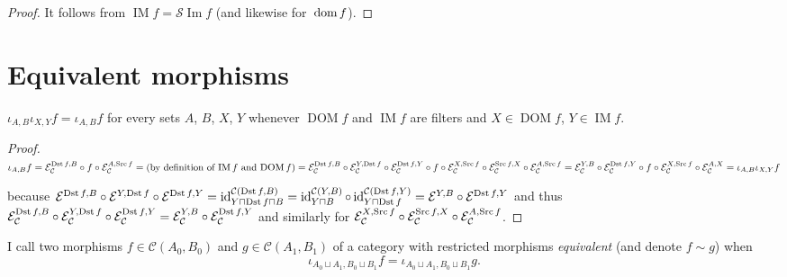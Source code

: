 \begin{proof}
It follows from $\operatorname{IM}f=\mathscr{S}\operatorname{Im}f$
(and likewise for~$\operatorname{dom} f$).
\end{proof}

\section{Equivalent morphisms}

\begin{prop}\label{two-iotas}
  $\iota_{A, B} \iota_{X, Y} f = \iota_{A, B} f$ for every sets $A$, $B$, $X$,
  $Y$ whenever $\operatorname{DOM} f$ and $\operatorname{IM} f$ are filters and $X \in
  \operatorname{DOM} f$, $Y \in \operatorname{IM} f$.
\end{prop}

\begin{proof}
  $\iota_{A, B} f =\mathcal{E}_{\mathcal{C}}^{\operatorname{Dst} f, B} \circ f \circ
  \mathcal{E}_{\mathcal{C}}^{A, \operatorname{Src} f} = \text{(by definition of
  $\operatorname{IM} f$ and $\operatorname{DOM} f$)} =\mathcal{E}_{\mathcal{C}}^{\operatorname{Dst} f,
  B} \circ \mathcal{E}_{\mathcal{C}}^{Y, \operatorname{Dst} f} \circ
  \mathcal{E}_{\mathcal{C}}^{\operatorname{Dst} f, Y} \circ f \circ
  \mathcal{E}_{\mathcal{C}}^{X, \operatorname{Src} f} \circ
  \mathcal{E}_{\mathcal{C}}^{\operatorname{Src} f, X} \circ
  \mathcal{E}_{\mathcal{C}}^{A, \operatorname{Src} f} =\mathcal{E}_{\mathcal{C}}^{Y,
  B} \circ \mathcal{E}_{\mathcal{C}}^{\operatorname{Dst} f, Y} \circ f \circ
  \mathcal{E}_{\mathcal{C}}^{X, \operatorname{Src} f} \circ
  \mathcal{E}_{\mathcal{C}}^{A, X} = \iota_{A, B} \iota_{X, Y} f$
  
  because $\mathcal{E}^{\operatorname{Dst} f, B} \circ \mathcal{E}^{Y, \operatorname{Dst} f}
  \circ \mathcal{E}^{\operatorname{Dst} f, Y} = \operatorname{id}^{\mathcal{C}(\operatorname{Dst} f, B)}_{Y \sqcap
  \operatorname{Dst} f \sqcap B} = \operatorname{id}^{\mathcal{C}(Y, B)}_{Y \sqcap B} \circ \operatorname{id}^{\mathcal{C}(\operatorname{Dst} f,Y)}_{Y \sqcap \operatorname{Dst} f} = \mathcal{E}^{Y, B} \circ
  \mathcal{E}^{\operatorname{Dst} f, Y}$ and thus
  $\mathcal{E}_{\mathcal{C}}^{\operatorname{Dst} f, B} \circ
  \mathcal{E}_{\mathcal{C}}^{Y, \operatorname{Dst} f} \circ
  \mathcal{E}_{\mathcal{C}}^{\operatorname{Dst} f, Y} =\mathcal{E}_{\mathcal{C}}^{Y,
  B} \circ \mathcal{E}_{\mathcal{C}}^{\operatorname{Dst} f, Y}$ and similarly for
  $\mathcal{E}_{\mathcal{C}}^{X, \operatorname{Src} f} \circ
  \mathcal{E}_{\mathcal{C}}^{\operatorname{Src} f, X} \circ
  \mathcal{E}_{\mathcal{C}}^{A, \operatorname{Src} f}$.
\end{proof}

\begin{defn}
I call two morphisms $f\in\mathcal{C}(A_0,B_0)$ and
$g\in\mathcal{C}(A_1,B_1)$
of a category with restricted morphisms \emph{equivalent}
(and denote $f\sim g$) when
\[\iota_{A_0\sqcup A_1,B_0\sqcup B_1}f=\iota_{A_0\sqcup A_1,B_0\sqcup B_1}g.\]
\end{defn}

